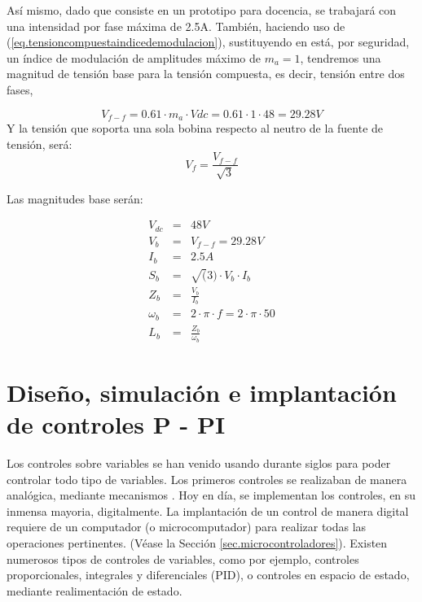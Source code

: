 \documentclass{report}
\begin{document}
Así mismo, dado que consiste en un prototipo para docencia, se trabajará con una intensidad por fase máxima de 2.5A. También, haciendo uso de (\ref{eq.tensioncompuestaindicedemodulacion}), sustituyendo en está, por seguridad, un índice de modulación de amplitudes máximo de $m_a=1$, tendremos una magnitud de tensión base para la tensión compuesta, es decir, tensión entre dos fases,

\begin{equation}
V_{f-f} = 0.61 \cdot m_a \cdot Vdc = 0.61 \cdot 1 \cdot 48 = 29.28V \label{eq.tensioncompuestaindicedemodulacion}
\end{equation}
Y la tensión que soporta una sola bobina respecto al neutro de la fuente de tensión, será:
\begin{equation*}
    V_{f} = \frac{V_{f-f}}{\sqrt{3}}
\end{equation*}

Las magnitudes base serán:

\begin{eqnarray*}
    V_{dc} &=& 48V \\
    V_{b} &=& V_{f-f} = 29.28V \\
    I_{b} &=&2.5 A\\
    S_{b} &=& \sqrt(3) \cdot V_{b} \cdot I_{b}\\
    Z_{b} &=& \frac{V_{b}}{I_{b}}\\
    \omega_{b} &=& 2 \cdot \pi \cdot f =  2 \cdot \pi \cdot 50\\
    L_{b} &=& \frac{Z_{b}}{\omega_{b}}
\end{eqnarray*}



\chapter{Diseño, simulación e implantación de controles P - PI} \label{sec.controlespid}

Los controles sobre variables se han venido usando durante siglos para poder controlar todo tipo de variables. Los primeros controles se realizaban de manera analógica, mediante mecanismos \cite{cincuentaycuatro}.
Hoy en día, se implementan los controles, en su inmensa mayoria, digitalmente. La implantación de un control de manera digital requiere de un computador (o microcomputador) para realizar todas las operaciones pertinentes. (Véase la Sección \ref{sec.microcontroladores}). 
Existen numerosos tipos de controles de variables, como por ejemplo, controles proporcionales, integrales y diferenciales (PID), o controles en espacio de estado, mediante realimentación de estado. 
\end{document}
